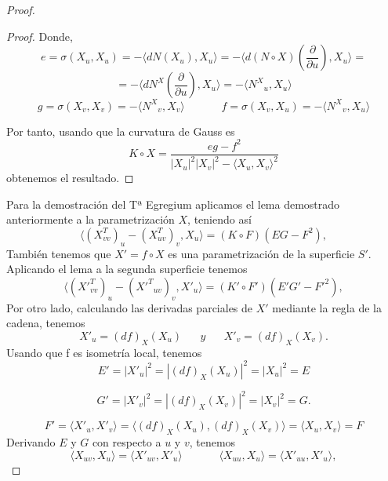 \begin{proof}
\begin{proof}
		Donde,
		${ }$\\
		\[
			e = \sigma(X_u, X_u) = - \langle dN(X_u), X_u \rangle = - \langle d(N\circ X)(\frac{\partial}{\partial u} ), X_u \rangle =
		\]
		\[
			= - \langle dN^X(\frac{\partial}{\partial u} ), X_u\rangle = - \langle {N^X}_u, X_u \rangle
		\]
	${ }$\\	
		\[
			g = \sigma (X_v, X_v) =  - \langle {N^X}_v, X_v \rangle \;\;\;\;\;\;\;\;\;\;\;\; f = \sigma (X_v, X_u) =  - \langle {N^X}_v, X_u \rangle
		\]
		
		Por tanto, usando que la curvatura de Gauss es
		${ }$\\
		\[
			K \circ X = \frac{eg - f^2}{|X_u|^2|X_v|^2 - \langle X_u, X_v\rangle ^2}
		\]
		${ }$\\
		obtenemos el resultado.

	\end{proof}
	
	
	Para la demostración del Tª Egregium aplicamos el lema demostrado anteriormente a la parametrización $X$, teniendo así
	${ }$\\
	\[
		\langle (X^{T}_{vv})_u - (X^{T}_{uv})_{v}, X_u \rangle = (K \circ F)(EG - F^2),
	\]
	${ }$\\
	
	También tenemos que $X' = f \circ X$ es una parametrización de la superficie $S'$. Aplicando el lema a la segunda superficie tenemos
	${ }$\\
	\[
		\langle ({X'}^{T}_{vv})_u - ({X'^T}_{uv})_v, X'_u \rangle = (K' \circ F')(E'G' - F'^2),
	\]
	${ }$\\
	
	Por otro lado, calculando las derivadas parciales de $X'$ mediante la regla de la cadena, tenemos
	${ }$\\
	\[
		{X'}_{u} = (df)_X(X_u) \;\;\;\;\;\; y \;\;\;\;\;\; X'_v = (df)_X(X_v).
	\]
	${ }$\\
	
	Usando que f es isometría local, tenemos
	${ }$\\
	\[
		E' = |X'_u|^2 = |(df)_X(X_u)|^2 = |X_u|^2 = E
	\]
	
	\[
		G' = |X'_v|^2 = |(df)_X(X_v)|^2 = |X_v|^2 = G.
	\]
	
	\[
		F' = \langle X'_u, X'_v \rangle = \langle (df)_X(X_u), (df)_X(X_v) \rangle = \langle X_u, X_v \rangle = F
	\]
	${ }$\\
	
	Derivando $E$ y $G$ con respecto a $u$ y $v$, tenemos
	${ }$\\
	\[
		\langle X_{uv}, X_u \rangle = \langle X'_{uv}, X'_u \rangle \;\;\;\;\;\;  \;\;\;\;\;\; \langle X_{uu}, X_u \rangle = \langle X'_{uu}, X'_u \rangle,
	\]
	

\end{proof}
